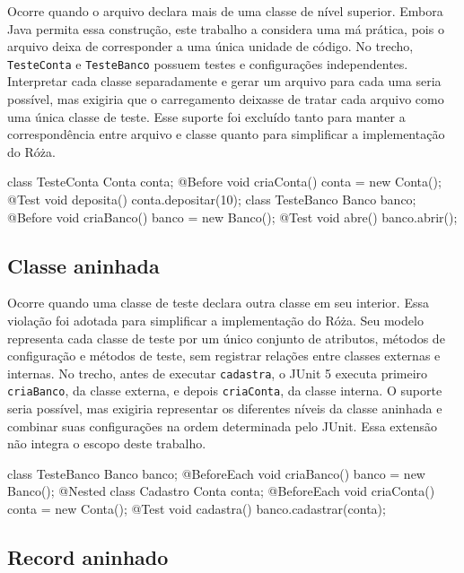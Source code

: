 Ocorre quando o arquivo declara mais de uma classe de nível superior. Embora Java permita essa construção, este trabalho a considera uma má prática, pois o arquivo deixa de corresponder a uma única unidade de código. No trecho, \texttt{TesteConta} e \texttt{TesteBanco} possuem testes e configurações independentes. Interpretar cada classe separadamente e gerar um arquivo para cada uma seria possível, mas exigiria que o carregamento deixasse de tratar cada arquivo como uma única classe de teste. Esse suporte foi excluído tanto para manter a correspondência entre arquivo e classe quanto para simplificar a implementação do Róża.

\begin{violationexample}
class TesteConta {
    Conta conta;
    @Before void criaConta() { conta = new Conta(); }
    @Test void deposita() { conta.depositar(10); }
}
class TesteBanco {
    Banco banco;
    @Before void criaBanco() { banco = new Banco(); }
    @Test void abre() { banco.abrir(); }
}
\end{violationexample}

\subsection{Classe aninhada}

Ocorre quando uma classe de teste declara outra classe em seu interior. Essa violação foi adotada para simplificar a implementação do Róża. Seu modelo representa cada classe de teste por um único conjunto de atributos, métodos de configuração e métodos de teste, sem registrar relações entre classes externas e internas. No trecho, antes de executar \texttt{cadastra}, o JUnit 5 executa primeiro \texttt{criaBanco}, da classe externa, e depois \texttt{criaConta}, da classe interna. O suporte seria possível, mas exigiria representar os diferentes níveis da classe aninhada e combinar suas configurações na ordem determinada pelo JUnit. Essa extensão não integra o escopo deste trabalho.

\begin{violationexample}
class TesteBanco {
    Banco banco;
    @BeforeEach void criaBanco() { banco = new Banco(); }
    @Nested class Cadastro {
        Conta conta;
        @BeforeEach void criaConta() { conta = new Conta(); }
        @Test void cadastra() { banco.cadastrar(conta); }
    }
}
\end{violationexample}

\subsection{Record aninhado}

